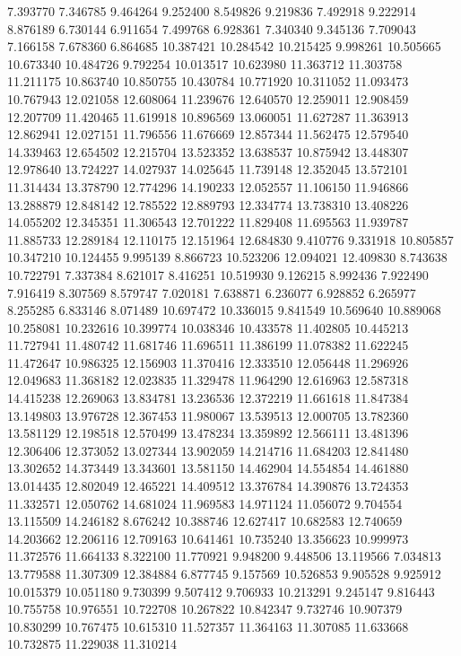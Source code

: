 7.393770
7.346785
9.464264
9.252400
8.549826
9.219836
7.492918
9.222914
8.876189
6.730144
6.911654
7.499768
6.928361
7.340340
9.345136
7.709043
7.166158
7.678360
6.864685
10.387421
10.284542
10.215425
9.998261
10.505665
10.673340
10.484726
9.792254
10.013517
10.623980
11.363712
11.303758
11.211175
10.863740
10.850755
10.430784
10.771920
10.311052
11.093473
10.767943
12.021058
12.608064
11.239676
12.640570
12.259011
12.908459
12.207709
11.420465
11.619918
10.896569
13.060051
11.627287
11.363913
12.862941
12.027151
11.796556
11.676669
12.857344
11.562475
12.579540
14.339463
12.654502
12.215704
13.523352
13.638537
10.875942
13.448307
12.978640
13.724227
14.027937
14.025645
11.739148
12.352045
13.572101
11.314434
13.378790
12.774296
14.190233
12.052557
11.106150
11.946866
13.288879
12.848142
12.785522
12.889793
12.334774
13.738310
13.408226
14.055202
12.345351
11.306543
12.701222
11.829408
11.695563
11.939787
11.885733
12.289184
12.110175
12.151964
12.684830
9.410776
9.331918
10.805857
10.347210
10.124455
9.995139
8.866723
10.523206
12.094021
12.409830
8.743638
10.722791
7.337384
8.621017
8.416251
10.519930
9.126215
8.992436
7.922490
7.916419
8.307569
8.579747
7.020181
7.638871
6.236077
6.928852
6.265977
8.255285
6.833146
8.071489
10.697472
10.336015
9.841549
10.569640
10.889068
10.258081
10.232616
10.399774
10.038346
10.433578
11.402805
10.445213
11.727941
11.480742
11.681746
11.696511
11.386199
11.078382
11.622245
11.472647
10.986325
12.156903
11.370416
12.333510
12.056448
11.296926
12.049683
11.368182
12.023835
11.329478
11.964290
12.616963
12.587318
14.415238
12.269063
13.834781
13.236536
12.372219
11.661618
11.847384
13.149803
13.976728
12.367453
11.980067
13.539513
12.000705
13.782360
13.581129
12.198518
12.570499
13.478234
13.359892
12.566111
13.481396
12.306406
12.373052
13.027344
13.902059
14.214716
11.684203
12.841480
13.302652
14.373449
13.343601
13.581150
14.462904
14.554854
14.461880
13.014435
12.802049
12.465221
14.409512
13.376784
14.390876
13.724353
11.332571
12.050762
14.681024
11.969583
14.971124
11.056072
9.704554
13.115509
14.246182
8.676242
10.388746
12.627417
10.682583
12.740659
14.203662
12.206116
12.709163
10.641461
10.735240
13.356623
10.999973
11.372576
11.664133
8.322100
11.770921
9.948200
9.448506
13.119566
7.034813
13.779588
11.307309
12.384884
6.877745
9.157569
10.526853
9.905528
9.925912
10.015379
10.051180
9.730399
9.507412
9.706933
10.213291
9.245147
9.816443
10.755758
10.976551
10.722708
10.267822
10.842347
9.732746
10.907379
10.830299
10.767475
10.615310
11.527357
11.364163
11.307085
11.633668
10.732875
11.229038
11.310214
